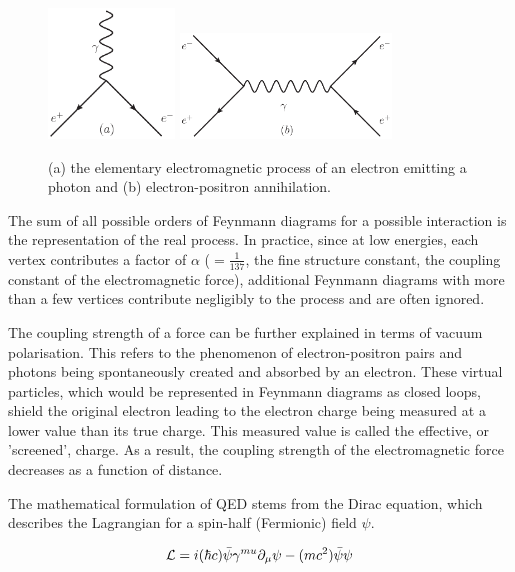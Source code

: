 \begin{figure}[hbtp]
   \centering
     \includegraphics[width=0.3\textwidth]{Chapters/02_Theory/Images/e_e_gamma}\hfill
     \includegraphics[width=0.5\textwidth]{Chapters/02_Theory/Images/e_e_gamma_e_e}
     \caption{(a) the elementary electromagnetic process of an electron emitting a photon and (b)
     electron-positron annihilation.}
     \label{fig:qed_processes}
\end{figure}


The sum of all possible orders of Feynmann diagrams for a possible interaction is the representation of the
real process. In practice, since at low energies, each vertex contributes a factor of $\alpha$
($=\frac{1}{137}$, the fine structure constant, the coupling constant of the electromagnetic force),
additional Feynmann diagrams with more than a few vertices contribute negligibly to the process and are often
ignored.

The coupling strength of a force can be further explained in terms of vacuum polarisation. This refers to the
phenomenon of electron-positron pairs and photons being spontaneously created and absorbed by an electron.
These virtual particles, which would be represented in Feynmann diagrams as closed loops, shield the original
electron leading to the electron charge being measured at a lower value than its true charge. This measured
value is called the effective, or 'screened', charge. As a result, the coupling strength of the
electromagnetic force decreases as a function of distance.

The mathematical formulation of QED stems from the Dirac equation, which describes the Lagrangian for a
spin-half (Fermionic) field $\psi$.

\begin{equation}
\mathcal{L} = i (\hbar c) \bar{\psi} \gamma^{mu} \partial_{\mu} \psi - (mc^{2}) \bar{\psi} \psi
\end{equation}

